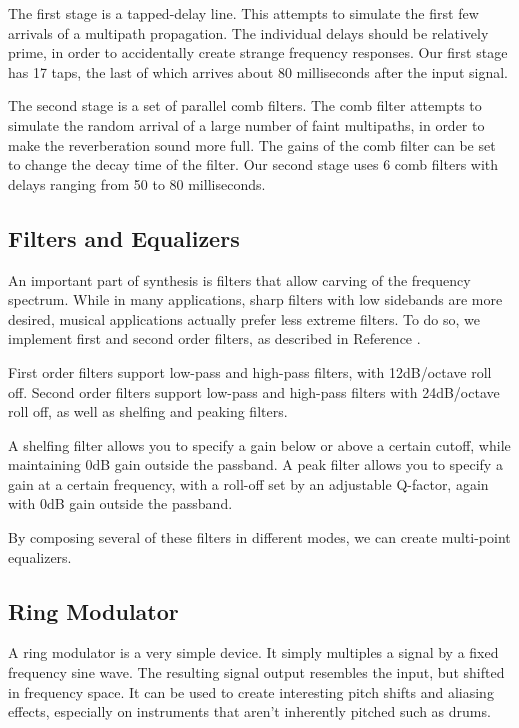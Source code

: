 \documentclass[letterpaper,12pt]{article}
\begin{document}
The first stage is a tapped-delay line. This attempts to simulate the first few arrivals of a multipath propagation. The individual delays should be relatively prime, in order to accidentally create strange frequency responses. Our first stage has 17 taps, the last of which arrives about 80 milliseconds after the input signal.

The second stage is a set of parallel comb filters. The comb filter attempts to simulate the random arrival of a large number of faint multipaths, in order to make the reverberation sound more full. The gains of the comb filter can be set to change the decay time of the filter. Our second stage uses 6 comb filters with delays ranging from 50 to 80 milliseconds.


\subsection{Filters and Equalizers}

An important part of synthesis is filters that allow carving of the frequency spectrum. While in many applications, sharp filters with low sidebands are more desired, musical applications actually prefer less extreme filters. To do so, we implement first and second order filters, as described in Reference \cite{dafx}.

First order filters support low-pass and high-pass filters, with 12dB/octave roll off. Second order filters support low-pass and high-pass filters with 24dB/octave roll off, as well as shelfing and peaking filters.

A shelfing filter allows you to specify a gain below or above a certain cutoff, while maintaining 0dB gain outside the passband. A peak filter allows you to specify a gain at a certain frequency, with a roll-off set by an adjustable Q-factor, again with 0dB gain outside the passband.

By composing several of these filters in different modes, we can create multi-point equalizers.


\subsection{Ring Modulator}

A ring modulator is a very simple device. It simply multiples a signal by a fixed frequency sine wave. The resulting signal output resembles the input, but shifted in frequency space. It can be used to create interesting pitch shifts and aliasing effects, especially on instruments that aren't inherently pitched such as drums.
\end{document}
